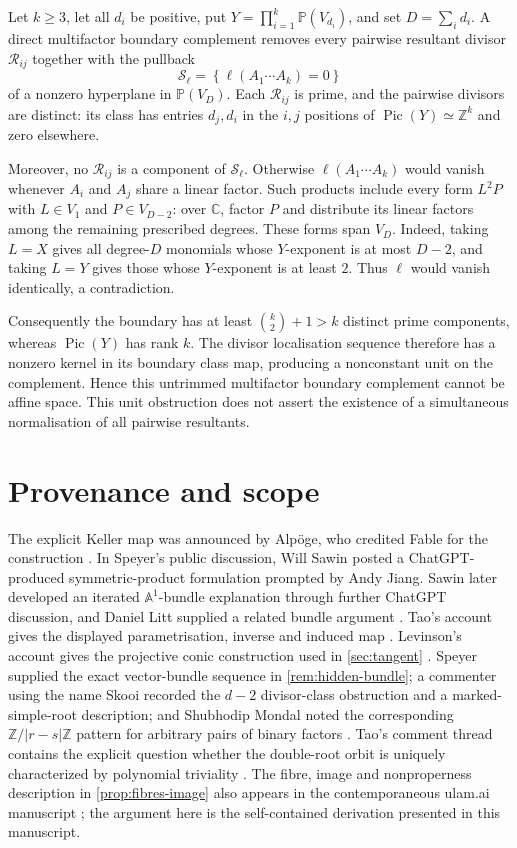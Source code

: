 \documentclass[11pt,reqno]{amsart}
\theoremstyle{definition}
\theoremstyle{remark}
\newcommand{\A}{\mathbb A}
\newcommand{\Pj}{\mathbb P}
\newcommand{\C}{\mathbb C}
\newcommand{\Z}{\mathbb Z}
\newcommand{\cR}{\mathcal R}
\newcommand{\cS}{\mathcal S}
\newcommand{\Pic}{\operatorname{Pic}}
\newcommand{\abs}[1]{\lvert #1\rvert}
\newcommand{\set}[1]{\left\{#1\right\}}
\begin{document}
Let $k\ge3$, let all $d_i$ be positive, put
$Y=\prod_{i=1}^k\Pj(V_{d_i})$, and set $D=\sum_i d_i$.  A direct
multifactor boundary complement removes every pairwise resultant divisor
$\cR_{ij}$ together with the pullback
\[
 \cS_\ell=\set{\ell(A_1\cdots A_k)=0}
\]
of a nonzero hyperplane in $\Pj(V_D)$.  Each $\cR_{ij}$ is prime, and
the pairwise divisors are distinct: its class has entries $d_j,d_i$ in
the $i,j$ positions of $\Pic(Y)\simeq\Z^k$ and zero elsewhere.

Moreover, no $\cR_{ij}$ is a component of $\cS_\ell$.  Otherwise
$\ell(A_1\cdots A_k)$ would vanish whenever $A_i$ and $A_j$ share a
linear factor.  Such products include every form $L^2P$ with
$L\in V_1$ and $P\in V_{D-2}$: over $\C$, factor $P$ and distribute its
linear factors among the remaining prescribed degrees.  These forms
span $V_D$.  Indeed, taking $L=X$ gives all degree-$D$ monomials whose
$Y$-exponent is at most $D-2$, and taking $L=Y$ gives those whose
$Y$-exponent is at least $2$.  Thus $\ell$ would vanish identically, a
contradiction.

Consequently the boundary has at least $\binom{k}{2}+1>k$ distinct
prime components, whereas $\Pic(Y)$ has rank $k$.  The divisor
localisation sequence therefore has a nonzero kernel in its boundary
class map, producing a nonconstant unit on the complement.  Hence this
untrimmed multifactor boundary complement cannot be affine space.  This
unit obstruction does not assert the existence of a simultaneous
normalisation of all pairwise resultants.

\section{Provenance and scope}

The explicit Keller map was announced by Alpöge, who credited Fable for
the construction \cite{AlpogeAnnouncement}.  In Speyer's public
discussion, Will Sawin posted a ChatGPT-produced symmetric-product
formulation prompted by Andy Jiang.  Sawin later developed an iterated
$\A^1$-bundle explanation through further ChatGPT discussion, and Daniel
Litt supplied a related bundle argument \cite{SpeyerThread}.  Tao's
account gives the displayed parametrisation, inverse and induced map
\cite{TaoDigestion}.  Levinson's account gives the projective conic
construction used in \cref{sec:tangent}
\cite{LevinsonGeometry}.  Speyer supplied the exact vector-bundle
sequence in \cref{rem:hidden-bundle}; a commenter using the name Skooi
recorded the $d-2$ divisor-class obstruction and a marked-simple-root
description; and Shubhodip Mondal noted the corresponding
$\Z/\abs{r-s}\Z$ pattern for arbitrary pairs of binary factors
\cite{SpeyerThread}.  Tao's comment thread contains the explicit question
whether the double-root orbit is uniquely characterized by polynomial
triviality \cite{TaoDigestion}.  The fibre, image and nonproperness
description in \cref{prop:fibres-image} also appears in the
contemporaneous ulam.ai manuscript \cite{AnonymousCounterexample}; the
argument here is the self-contained derivation presented in this
manuscript.
\end{document}
